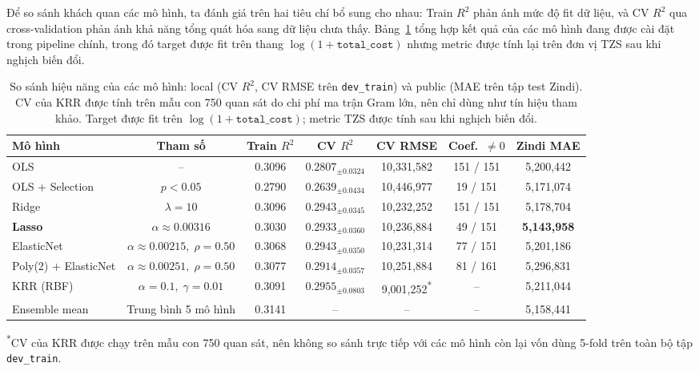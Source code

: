 
Để so sánh khách quan các mô hình, ta đánh giá trên hai tiêu chí bổ sung cho nhau: Train $R^2$ phản ánh mức độ fit dữ liệu, và CV $R^2$ qua cross-validation phản ánh khả năng tổng quát hóa sang dữ liệu chưa thấy. Bảng~\ref{tab:model_comparison} tổng hợp kết quả của các mô hình đang được cài đặt trong pipeline chính, trong đó target được fit trên thang $\log(1 + \texttt{total\_cost})$ nhưng metric được tính lại trên đơn vị TZS sau khi nghịch biến đổi.

\begin{table}[H]
\centering
\caption{So sánh hiệu năng của các mô hình: local (CV $R^2$, CV RMSE trên \texttt{dev\_train}) và public (MAE trên tập test Zindi). CV của KRR được tính trên mẫu con 750 quan sát do chi phí ma trận Gram lớn, nên chỉ dùng như tín hiệu tham khảo. Target được fit trên $\log(1+\texttt{total\_cost})$; metric TZS được tính sau khi nghịch biến đổi.}
\label{tab:model_comparison}
\small
\begin{tabular}{@{}lcccccc@{}}
\toprule
\textbf{Mô hình} & \textbf{Tham số} & \textbf{Train $R^2$} & \textbf{CV $R^2$} & \textbf{CV RMSE} & \textbf{Coef.\ $\neq 0$} & \textbf{Zindi MAE} \\
\midrule
OLS                  & --                                  & 0.3096 & $0.2807_{\pm 0.0324}$         & 10{,}331{,}582  & 151 / 151 & 5{,}200{,}442 \\
OLS + Selection      & $p < 0.05$                          & 0.2790 & $0.2639_{\pm 0.0434}$         & 10{,}446{,}977  & 19 / 151  & 5{,}171{,}074 \\
Ridge                & $\lambda = 10$                      & 0.3096 & $0.2943_{\pm 0.0345}$         & 10{,}232{,}252  & 151 / 151 & 5{,}178{,}704 \\
\textbf{Lasso}       & $\alpha \approx 0.00316$            & 0.3030 & $0.2933_{\pm 0.0360}$         & 10{,}236{,}884  & 49 / 151  & \textbf{5{,}143{,}958} \\
ElasticNet           & $\alpha\approx0.00215,\;\rho=0.50$  & 0.3068 & $0.2943_{\pm 0.0350}$         & 10{,}231{,}314  & 77 / 151  & 5{,}201{,}186 \\
Poly(2) + ElasticNet & $\alpha\approx0.00251,\;\rho=0.50$  & 0.3077 & $0.2914_{\pm 0.0357}$         & 10{,}251{,}884  & 81 / 161  & 5{,}296{,}831 \\
KRR (RBF)            & $\alpha=0.1,\;\gamma=0.01$          & 0.3091 & $0.2955_{\pm 0.0803}$         & 9{,}001{,}252\textsuperscript{*} & -- & 5{,}211{,}044 \\
Ensemble mean        & Trung bình 5 mô hình                & 0.3141 & --                            & --              & --        & 5{,}158{,}441 \\
\bottomrule
\end{tabular}
\end{table}
\noindent\textsuperscript{*}\;CV của KRR được chạy trên mẫu con 750 quan sát, nên không so sánh trực tiếp với các mô hình còn lại vốn dùng 5-fold trên toàn bộ tập \texttt{dev\_train}.

